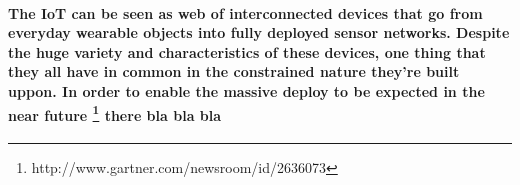 \paragraph{The \ac{IoT} can be seen as web of interconnected devices that go from everyday wearable objects into fully deployed sensor networks. Despite the huge variety and characteristics of these devices, one thing that they all have in common in the constrained nature they're built uppon. In order to enable the massive deploy to be expected in the near future \footnote{http://www.gartner.com/newsroom/id/2636073} there bla bla bla
}
